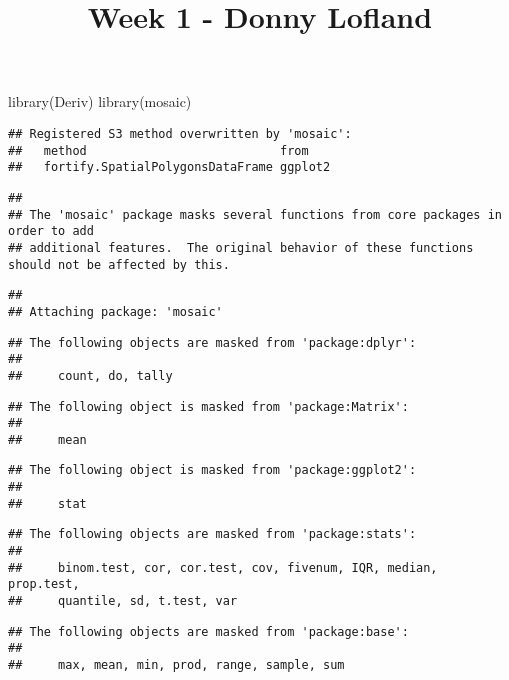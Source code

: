 \documentclass[
]{article}
\title{Week 1 - Donny Lofland}
\author{}
\date{\vspace{-2.5em}}
\newenvironment{Shaded}{\begin{snugshade}}{\end{snugshade}}
\newcommand{\FunctionTok}[1]{\textcolor[rgb]{0.00,0.00,0.00}{#1}}
\newcommand{\NormalTok}[1]{#1}
\begin{document}
\maketitle

\begin{Shaded}
\begin{Highlighting}[]
\FunctionTok{library}\NormalTok{(Deriv)}
\FunctionTok{library}\NormalTok{(mosaic)}
\end{Highlighting}
\end{Shaded}

\begin{verbatim}
## Registered S3 method overwritten by 'mosaic':
##   method                           from   
##   fortify.SpatialPolygonsDataFrame ggplot2
\end{verbatim}

\begin{verbatim}
## 
## The 'mosaic' package masks several functions from core packages in order to add 
## additional features.  The original behavior of these functions should not be affected by this.
\end{verbatim}

\begin{verbatim}
## 
## Attaching package: 'mosaic'
\end{verbatim}

\begin{verbatim}
## The following objects are masked from 'package:dplyr':
## 
##     count, do, tally
\end{verbatim}

\begin{verbatim}
## The following object is masked from 'package:Matrix':
## 
##     mean
\end{verbatim}

\begin{verbatim}
## The following object is masked from 'package:ggplot2':
## 
##     stat
\end{verbatim}

\begin{verbatim}
## The following objects are masked from 'package:stats':
## 
##     binom.test, cor, cor.test, cov, fivenum, IQR, median, prop.test,
##     quantile, sd, t.test, var
\end{verbatim}

\begin{verbatim}
## The following objects are masked from 'package:base':
## 
##     max, mean, min, prod, range, sample, sum
\end{verbatim}
\end{document}
